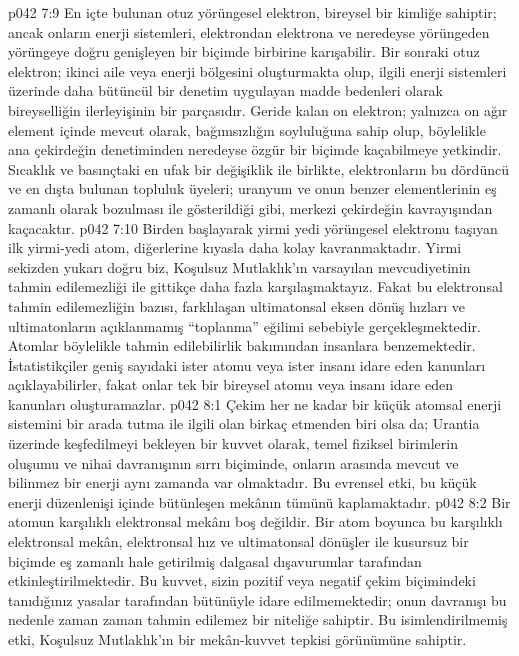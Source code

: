 \vs p042 7:9 En içte bulunan otuz yörüngesel elektron, bireysel bir kimliğe sahiptir; ancak onların enerji sistemleri, elektrondan elektrona ve neredeyse yörüngeden yörüngeye doğru genişleyen bir biçimde birbirine karışabilir. Bir sonraki otuz elektron; ikinci aile veya enerji bölgesini oluşturmakta olup, ilgili enerji sistemleri üzerinde daha bütüncül bir denetim uygulayan madde bedenleri olarak bireyselliğin ilerleyişinin bir parçasıdır. Geride kalan on elektron; yalnızca on ağır element içinde mevcut olarak, bağımsızlığın soyluluğuna sahip olup, böylelikle ana çekirdeğin denetiminden neredeyse özgür bir biçimde kaçabilmeye yetkindir. Sıcaklık ve basınçtaki en ufak bir değişiklik ile birlikte, elektronların bu dördüncü ve en dışta bulunan topluluk üyeleri; uranyum ve onun benzer elementlerinin eş zamanlı olarak bozulması ile gösterildiği gibi, merkezi çekirdeğin kavrayışından kaçacaktır.
\vs p042 7:10 Birden başlayarak yirmi yedi yörüngesel elektronu taşıyan ilk yirmi\hyp{}yedi atom, diğerlerine kıyasla daha kolay kavranmaktadır. Yirmi sekizden yukarı doğru biz, Koşulsuz Mutlaklık’ın varsayılan mevcudiyetinin tahmin edilemezliği ile gittikçe daha fazla karşılaşmaktayız. Fakat bu elektronsal tahmin edilemezliğin bazısı, farklılaşan ultimatonsal eksen dönüş hızları ve ultimatonların açıklanmamış “toplanma” eğilimi sebebiyle gerçekleşmektedir. Atomlar böylelikle tahmin edilebilirlik bakımından insanlara benzemektedir. İstatistikçiler geniş sayıdaki ister atomu veya ister insanı idare eden kanunları açıklayabilirler, fakat onlar tek bir bireysel atomu veya insanı idare eden kanunları oluşturamazlar.
\vs p042 8:1 Çekim her ne kadar bir küçük atomsal enerji sistemini bir arada tutma ile ilgili olan birkaç etmenden biri olsa da; Urantia üzerinde keşfedilmeyi bekleyen bir kuvvet olarak, temel fiziksel birimlerin oluşumu ve nihai davranışının sırrı biçiminde, onların arasında mevcut ve bilinmez bir enerji aynı zamanda var olmaktadır. Bu evrensel etki, bu küçük enerji düzenlenişi içinde bütünleşen mekânın tümünü kaplamaktadır.
\vs p042 8:2 Bir atomun karşılıklı elektronsal mekânı boş değildir. Bir atom boyunca bu karşılıklı elektronsal mekân, elektronsal hız ve ultimatonsal dönüşler ile kusursuz bir biçimde eş zamanlı hale getirilmiş dalgasal dışavurumlar tarafından etkinleştirilmektedir. Bu kuvvet, sizin pozitif veya negatif çekim biçimindeki tanıdığınız yasalar tarafından bütünüyle idare edilmemektedir; onun davranışı bu nedenle zaman zaman tahmin edilemez bir niteliğe sahiptir. Bu isimlendirilmemiş etki, Koşulsuz Mutlaklık’ın bir mekân\hyp{}kuvvet tepkisi görünümüne sahiptir.
